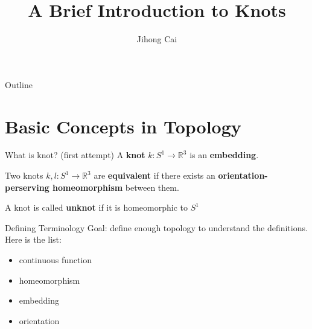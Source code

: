 \documentclass[handout, aspectratio=169]{beamer}
\title{A Brief Introduction to Knots}
\subtitle{}
\author{Jihong Cai}
\date{}
\begin{document}

\begin{frame}
\titlepage
\end{frame}

\begin{frame}{Outline}
  \tableofcontents
\end{frame}

\section{Basic Concepts in Topology}
\begin{frame}{What is knot? (first attempt)}
A \textbf{knot} $k:S^1\rightarrow \mathbb R^3$ is an \textbf{embedding}.

Two knots $k, l:S^1\rightarrow\mathbb R^3$ are \textbf{equivalent} if there exists an \textbf{orientation-perserving homeomorphism} between them.

A knot is called \textbf{unknot} if it is homeomorphic to $S^1$
\end{frame}

\begin{frame}{Defining Terminology}
Goal: define enough topology to understand the definitions. Here is the list:
\begin{itemize}
    \item continuous function
    \item homeomorphism
    \item embedding
    \item orientation
\end{itemize}
\end{frame}
\end{document}
